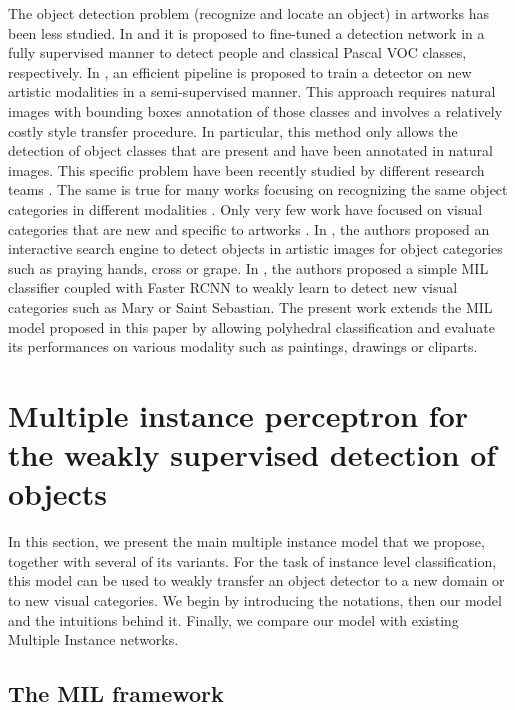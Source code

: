 \documentclass[preprint]{elsarticle}
\begin{document}
The object detection problem (recognize and locate an object) in artworks has been less studied.
In \cite{westlake_detecting_2016} and \cite{strezoski_omniart_2018} it is proposed to fine-tuned a detection network in a fully supervised manner to detect people and classical Pascal VOC classes, respectively.
In \cite{inoue_crossdomain_2018}, an efficient pipeline is proposed to train a detector on new artistic modalities in a semi-supervised manner. This approach requires natural images with bounding boxes annotation of those classes and involves a relatively costly style transfer procedure. In particular, this method only allows the detection of object classes that are present and have been annotated in natural images. This specific problem have been recently studied by different research teams \cite{saito_strongweak_2019,fu_deeply_2020}. The same is true for many works focusing on recognizing the same object categories in different modalities \cite{li_deeper_2017,wilber_bam_2017,thomas_artistic_2018}.
Only very few work have focused on visual categories that are new and specific to artworks \cite{lang_finding_2019,gonthier_weakly_2018}.
In \cite{lang_finding_2019}, the authors proposed an interactive search engine to detect objects in artistic images for  object categories such as praying hands, cross or grape.
In \cite{gonthier_weakly_2018}, the authors proposed a simple MIL classifier coupled with Faster RCNN \cite{ren_faster_2015} to weakly learn to detect new visual categories such as Mary or Saint Sebastian. The present work extends the MIL model proposed in this paper by allowing polyhedral classification and evaluate its performances on various modality such as paintings, drawings or cliparts. 




\section{Multiple instance perceptron for the weakly supervised detection of objects}
\label{sec:PresentationModel}

In this section, we present the main multiple instance model that we propose, together with several of its variants. For the task of instance level classification, this model can be used to weakly transfer an object detector to a new domain or to new visual categories. We begin by introducing the notations, then our model and the intuitions behind it. Finally, we compare our model with existing Multiple Instance networks.

\subsection{The MIL framework}
\end{document}

